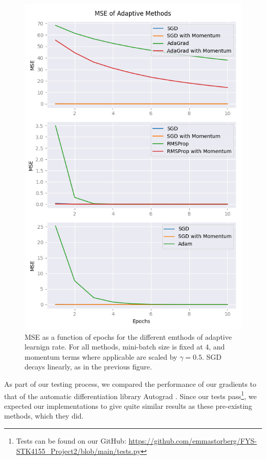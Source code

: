 \begin{figure}
    \centering
    \includegraphics[width=\linewidth]{figures/all_plots/MSEGD.png}
    \caption{MSE as a function of epochs for the different emthods of adaptive learnign rate. For all methods, mini-batch size is fixed at 4, and momentum terms where applicable are scaled by $\gamma = 0.5$. SGD decays linearly, as in the previous figure.}
    \label{fig:MSEGD}
\end{figure}

As part of our testing process, we compared the performance of our gradients to that of the automatic differentiation library Autograd \cite{autograd}. Since our tests pass\footnote{Tests can be found on our GitHub: \url{https://github.com/emmastorberg/FYS-STK4155_Project2/blob/main/tests.py}}, we expected our implementations to give quite similar results as these pre-existing methods, which they did.
\vspace{3cm}

